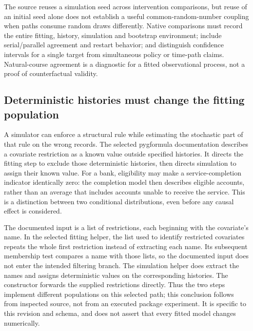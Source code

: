 The source reuses a simulation seed across intervention comparisons, but
reuse of an initial seed alone does not establish a useful common-random-number
coupling when paths consume random draws differently. Native comparisons
must record the entire fitting, history, simulation and bootstrap environment;
include serial/parallel agreement and restart behavior; and distinguish
confidence intervals for a single target from simultaneous policy or time-path
claims. Natural-course agreement is a diagnostic for a fitted observational
process, not a proof of counterfactual validity.
\citep{exec24_longpy_pygformula_source}

\subsection{Deterministic histories must change the fitting population}
A simulator can enforce a structural rule while estimating the stochastic
part of that rule on the wrong records. The selected pygformula documentation
describes a covariate restriction as a known value outside specified histories.
It directs the fitting step to exclude those deterministic histories, then
directs simulation to assign their known value. For a bank, eligibility may
make a service-completion indicator identically zero: the completion model
then describes eligible accounts, rather than an average that includes
accounts unable to receive the service. This is a distinction between two
conditional distributions, even before any causal effect is considered.
\citep{rel25pygfit}

The documented input is a list of restrictions, each beginning with the
covariate's name. In the selected fitting helper, the list used to identify
restricted covariates repeats the whole first restriction instead of extracting
each name. Its subsequent membership test compares a name with those lists,
so the documented input does not enter the intended filtering branch.
The simulation helper does extract the names and assigns deterministic
values on the corresponding histories. The constructor forwards the supplied
restrictions directly. Thus the two steps implement different populations
on this selected path; this conclusion follows from inspected source, not
from an executed package experiment. It is specific to this revision and
schema, and does not assert that every fitted model changes numerically.
\citep{rel25pygfit}


